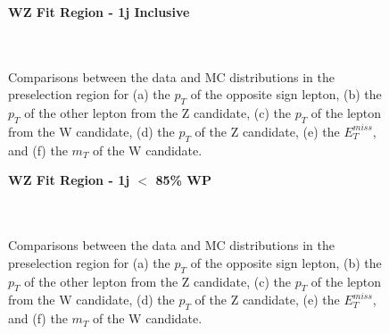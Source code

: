\begin{figure}[H] 
    \centering
    \textbf{WZ Fit Region - 1j Inclusive}\\                                                                                  
    \\                     
    \\                     
    \caption{Comparisons between the data and MC distributions in the preselection region for (a) the $p_T$ of the opposite sign lepton, (b) the $p_T$ of the other lepton from the Z candidate, (c) the $p_T$ of the lepton from the W candidate, (d) the $p_T$ of the Z candidate, (e) the $E_T^{miss}$, and (f) the $m_T$ of the W candidate.}                                      
    \label{kin:WP_1j_inc}                                                                                                    
\end{figure}

\begin{figure}[H] 
    \centering
    \textbf{WZ Fit Region - 1j $<$ 85\% WP}\\
    \\
    \\
    \caption{Comparisons between the data and MC distributions in the preselection region for (a) the $p_T$ of the opposite sign lepton, (b) the $p_T$ of the other lepton from the Z candidate, (c) the $p_T$ of the lepton from the W candidate, (d) the $p_T$ of the Z candidate, (e) the $E_T^{miss}$, and (f) the $m_T$ of the W candidate.}
    \label{kin:WP_1j_not85}
\end{figure}

